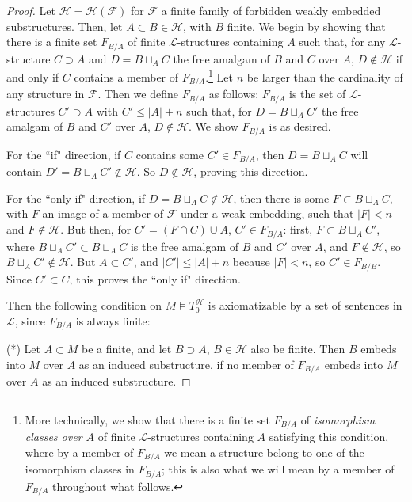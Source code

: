 \documentclass{amsart}
\theoremstyle{definition}
\theoremstyle{remark}
\numberwithin{equation}{section}
\begin{document}
\begin{proof}
Let $\mathcal{H} = \mathcal{H}(\mathcal{F})$ for $\mathcal{F}$ a finite family of forbidden weakly embedded substructures. Then, let $A \subset B \in \mathcal{H}$, with $B$ finite. We begin by showing that there is a finite set $F_{B/A}$ of finite $\mathcal{L}$-structures containing $A$ such that, for any $\mathcal{L}$-structure $C \supset A$ and $D= B\sqcup_{A} C $ the free amalgam of $B$ and $C$ over $A$, $D \notin \mathcal{H}$ if and only if $C$ contains a member of $F_{B/A}$.\footnote{More technically, we show that there is a finite set $F_{B/A}$ of \textit{isomorphism classes over $A$} of finite $\mathcal{L}$-structures containing $A$ satisfying this condition, where by a member of $F_{B/A}$ we mean a structure belong to one of the isomorphism classes in $F_{B/A}$; this is also what we will mean by a member of $F_{B/A}$ throughout what follows.} Let $n$ be larger than the cardinality of any structure in $\mathcal{F}$. Then we define $F_{B/A}$ as follows: $F_{B/A}$ is the set of $\mathcal{L}$-structures $C' \supset A$ with $C'\leq |A|+ n$ such that, for $D = B\sqcup_{A} C' $ the free amalgam of $B$ and $C'$ over $A$, $D \notin \mathcal{H}$. We show $F_{B/A}$ is as desired.

For the ``if" direction, if $C$ contains some $C' \in F_{B/A}$, then $D= B\sqcup_{A} C $ will contain $D'= B\sqcup_{A} C' \notin \mathcal{H} $. So $D \notin \mathcal{H}$, proving this direction.

For the ``only if" direction, if $D= B\sqcup_{A} C \notin \mathcal{H}$, then there is some $F \subset B\sqcup_{A} C$, with $F$ an image of a member of $\mathcal{F}$ under a weak embedding, such that $|F| < n$ and $F \notin \mathcal{H}$. But then, for $C' = (F \cap C) \cup A$, $C' \in F_{B/A}$: first, $F \subset B\sqcup_{A} C'$, where $B\sqcup_{A} C' \subset B\sqcup_{A} C$ is the free amalgam of $B$ and $C'$ over $A$, and $F \notin \mathcal{H}$, so $B\sqcup_{A} C' \notin \mathcal{H}$. But $A \subset C' $, and $|C'| \leq |A| + n$ because $|F| < n$, so $C' \in F_{B/B}$. Since $C' \subset C$, this proves the ``only if" direction.


Then the following condition on $M \models T^{\mathcal{H}}_{0}$ is axiomatizable by a set of sentences in $\mathcal{L}$, since $F_{B/A}$ is always finite:

(*) Let $A \subset M$ be a finite, and let $B \supset A$, $B \in \mathcal{H}$ also be finite. Then $B$ embeds into $M$ over $A$ as an induced substructure, if no member of $F_{B/A}$ embeds into $M$ over $A$ as an induced substructure.


\end{proof}
\end{document}
